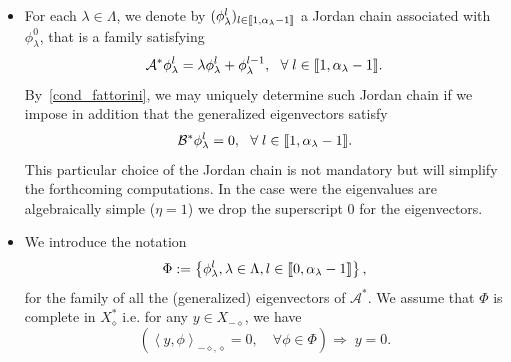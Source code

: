 \documentclass[11pt]{article}
\theoremstyle{definition}
\numberwithin{equation}{section}
\numberwithin{figure}{section}
\numberwithin{table}{section}
\newcommand{\llbracket}{\mathopen{[\mkern -2.7mu[}}
\newcommand{\rrbracket}{\mathclose{]\mkern -2.7mu]}}
\newcommand{\inter}[2]{\llbracket #1,#2 \rrbracket}
\newcommand\As{\mathcal{A}^*}
\newcommand\Bs{\mathcal{B}^*}
\newcommand{\Xalphas}{X_\diamond^*}
\newcommand{\Xmalpha}{X_{-\diamond}}
\newcommand{\Fzp}{Y_0}
\newcommand{\dual}[2]{\left\langle #1, #2 \right\rangle_{-\diamond,\diamond}}
\let\oldforall\forall
\renewcommand*{\forall}{\mathrel{\oldforall}}
\begin{document}
\begin{itemize}
As we are interested in null-controllability properties of system~\eqref{systeme}, we will first assume that
\begin{equation}\label{cond_fattorini}
\Bs \phi_\lambda^0 \neq 0, \ \ \text{for any } \lambda\in \Lambda.
\end{equation}
This is a necessary condition for the approximate controllability of system~\eqref{systeme}, and is therefore mandatory if we expect null-controllability to hold. In our setting, the assumption~\eqref{cond_fattorini} is also a sufficient condition for approximate controllability (see~\cite{Fattorini66, Olive13}).

When the considered set of initial data $\Fzp$ is not the whole space $\Xmalpha$, the approximate controllability condition~\eqref{cond_fattorini} can be too strong and we can relax it. We will discuss this point in Section~\ref{Sec:Gestion_de_B*}.


\item For each $\lambda\in \Lambda$, we denote by $(\phi_\lambda^l)_{l \in \inter{1}{\alpha_\lambda-1}}$ a Jordan chain associated with $\phi_\lambda^0$, that is a family satisfying
\begin{equation*}\label{def_chaine_Jordan}
\As \phi_\lambda^l = \lambda \phi_\lambda^l + \phi_\lambda^{l-1}, \ \ \forall l\in \inter{1}{\alpha_{\lambda}-1}.
\end{equation*}
By~\eqref{cond_fattorini}, we may uniquely determine such Jordan chain if we impose in addition that the generalized eigenvectors satisfy
\begin{equation}\label{normalisation_chaine_Jordan}
\Bs \phi_\lambda^l = 0, \ \ \forall l \in \inter{1}{\alpha_{\lambda}-1}.
\end{equation}
This particular choice of the Jordan chain is not mandatory but will simplify the forthcoming computations. In the case were the eigenvalues are algebraically simple ($\eta =1$) we drop the superscript $0$ for the eigenvectors.
\item We introduce the notation
\[
\Phi:=\left\{\phi_\lambda^l, \lambda\in \Lambda, l\in \inter{0}{\alpha_\lambda-1} \right\},
\]
for the family of all the (generalized) eigenvectors of $\As$. We assume that $\Phi$ is complete in $\Xalphas$ i.e. for any $y \in \Xmalpha$, we have
\begin{equation}\label{FamilleComplete}
\left(\dual{y}{\phi} =0, \quad \forall \phi\in \Phi \right) \Longrightarrow \; y=0.
\end{equation}
\end{itemize}
\end{document}

